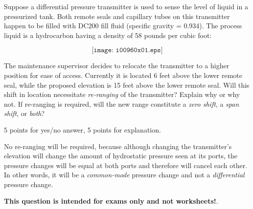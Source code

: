 

Suppose a differential pressure transmitter is used to sense the level of liquid in a pressurized tank.  Both remote seals and capillary tubes on this transmitter happen to be filled with DC200 fill fluid (specific gravity = 0.934).  The process liquid is a hydrocarbon having a density of 58 pounds per cubic foot:

$$\texttt{[image: i00960x01.eps]}$$

The maintenance supervisor decides to relocate the transmitter to a higher position for ease of access.  Currently it is located 6 feet above the lower remote seal, while the proposed elevation is 15 feet above the lower remote seal.  Will this shift in location necessitate {\it re-ranging} of the transmitter?  Explain why or why not.  If re-ranging is required, will the new range constitute a {\it zero shift}, a {\it span shift}, or {\it both}?

\vskip 50pt







5 points for yes/no answer, 5 points for explanation.

\vskip 10pt

No re-ranging will be required, because although changing the transmitter's elevation will change the amount of hydrostatic pressure seen at its ports, the pressure changes will be equal at both ports and therefore will cancel each other.  In other words, it will be a {\it common-mode} pressure change and not a {\it differential} pressure change.







{\bf This question is intended for exams only and not worksheets!}.



